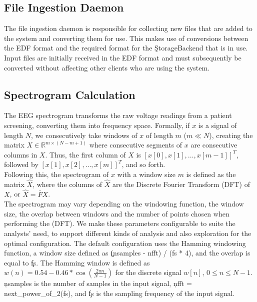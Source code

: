\subsection{File Ingestion Daemon}

The file ingestion daemon is responsible for collecting new files that are
added to the system and converting them for use. This makes use of conversions
between the EDF format and the required format for the \c{StorageBackend} that
is in use. Input files are initially received in the EDF format and must
subsequently be converted without affecting other clients who are using the
system.

\subsection{Spectrogram Calculation}\label{compute-ch:design-spectrogram}

The EEG spectrogram transforms the raw voltage readings from a patient
screening, converting them into frequency space. Formally, if $x$ is a signal
of length $N$, we consecutively take windows of $x$ of length $m$ ($m \ll N$),
creating the matrix $X \in \mathbb{R}^{m \times (N - m + 1)}$ where consecutive
segments of $x$ are consecutive columns in $X$. Thus, the first column of $X$
is $[x[0], x[1], \ldots, x[m-1]]^T$, followed by $[x[1], x[2], \ldots,
x[m]]^T$, and so forth. \\

Following this, the spectrogram of $x$ with a window size $m$ is defined as the
matrix $\hat{X}$, where the columns of $\hat{X}$ are the Discrete Fourier
Transform (DFT) of $X$, or $\hat{X} = \bar{F}X$. \\

The spectrogram may vary depending on the windowing function, the window size,
the overlap between windows and the number of points chosen when performing the
(DFT). We make these parameters configurable to suite the analysts' need, to
support different kinds of analysis and also exploration for the optimal
configuration. The default configuration uses the Hamming windowing function, a
window size defined as \c{(nsamples - nfft) / (fs * 4)}, and the overlap is
equal to \c{fs}.  The Hamming window is defined as $w(n) = 0.54 -
0.46*\cos(\frac{2 \pi n}{N -1})$ for the discrete signal $w[n]$, $0 \leq n \leq
N -1$. \c{nsamples} is the number of samples in the input signal, \c{nfft =
  next\_power\_of\_2(fs)}, and \c{fs} is the sampling frequency of the input
signal.

